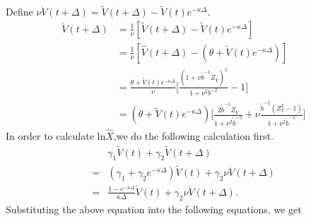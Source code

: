 \documentclass{ws-ijfe}
\begin{document}
Define $\nu \mathring{V}(t+\Delta)=\tilde{V}(t+\Delta)-\tilde{V}(t)e^{-\kappa\Delta}$.\\
\begin{equation*}
\begin{split}
\mathring{V}(t+\Delta)&=\frac{1}{\nu}[\tilde{V}(t+\Delta)-\tilde{V}(t)e^{-\kappa\Delta}]\\
&=\frac{1}{\nu}[\hat{V}(t+\Delta)-(\theta+\tilde{V}(t)e^{-\kappa\Delta})]\\
&=\frac{\theta+\tilde{V}(t)e^{-\kappa\Delta}}{\nu}\bigg[\frac{(1+\nu\tilde{b}^{-1}Z_V)^2}{1+\nu^2b^{-2}}-1\bigg]\\
&=(\theta+\tilde{V}(t)e^{-\kappa\Delta})\bigg[\frac{2\tilde{b}^{-1}Z_V}{1+\nu^2\tilde{b}^{-2}}+\nu\frac{\tilde{b}^{-2}(Z_V^2-1)}{1+\nu^2\tilde{b}^{-2}}\bigg]
\end{split}
\end{equation*}
In order to calculate $\text{ln}\hat{X}$,we do the following calculation first.\\
\begin{equation*}
\begin{split}
&\gamma_1\tilde{V}(t)+\gamma_2\tilde{V}(t+\Delta)\\
=& (\gamma_1+\gamma_2e^{-\kappa\Delta})\tilde{V}(t)+\gamma_2\nu\mathring{V}(t+\Delta)\\
=& \frac{1-e^{-\kappa\Delta}}{\kappa\Delta}\tilde{V}(t)+\gamma_2\nu\mathring{V}(t+\Delta).
\end{split}
\end{equation*}
Substituting the above equation into the following equations, we get
\end{document}
